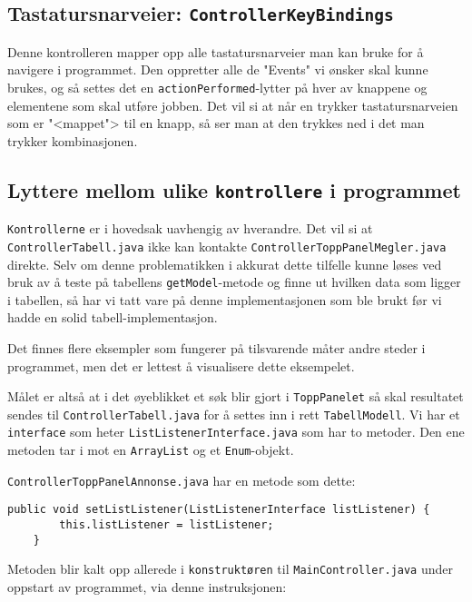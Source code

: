 \subsection{Tastatursnarveier: \texttt{ControllerKeyBindings}}
Denne kontrolleren mapper opp alle tastatursnarveier man kan bruke for å navigere i programmet. Den oppretter alle de "Events" vi ønsker skal kunne brukes, og så settes det en \texttt{actionPerformed}-lytter på hver av knappene og elementene som skal utføre jobben. Det vil si at når en trykker tastatursnarveien som er "<mappet"> til en knapp, så ser man at den trykkes ned i det man trykker kombinasjonen.



\subsection{Lyttere mellom ulike \texttt{kontrollere} i programmet} \label{sec:kontrollerlyttere}

\texttt{Kontrollerne} er i hovedsak uavhengig av hverandre. Det vil si at \texttt{ControllerTabell.java} ikke kan kontakte \texttt{ControllerToppPanelMegler.java} direkte. Selv om denne problematikken i akkurat dette tilfelle kunne løses ved bruk av å teste på tabellens \texttt{getModel}-metode og finne ut hvilken data som ligger i tabellen, så har vi tatt vare på denne implementasjonen som ble brukt før vi hadde en solid tabell-implementasjon.

Det finnes flere eksempler som fungerer på tilsvarende måter andre steder i programmet, men det er lettest å visualisere dette eksempelet.

Målet er altså at i det øyeblikket et søk blir gjort i \texttt{ToppPanelet} så skal resultatet sendes til \texttt{ControllerTabell.java} for å settes inn i rett \texttt{TabellModell}.
Vi har et \texttt{interface} som heter \texttt{ListListenerInterface.java} som har to metoder. Den ene metoden tar i mot en \texttt{ArrayList} og et \texttt{Enum}-objekt.

\texttt{ControllerToppPanelAnnonse.java} har en metode som dette:

\begin{lstlisting}[caption=\texttt{setListListener}-metoden fra \texttt{ControllerToppPanelAnnonse.java},label=kode:snutt1]
    public void setListListener(ListListenerInterface listListener) {
        this.listListener = listListener;
    }
\end{lstlisting}

Metoden blir kalt opp allerede i \texttt{konstruktøren} til \texttt{MainController.java} under oppstart av programmet, via denne instruksjonen:

